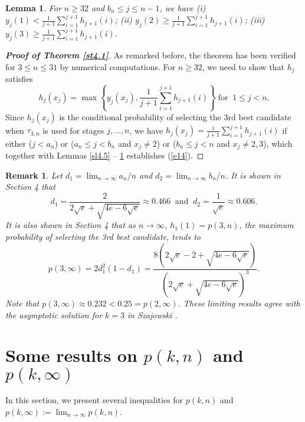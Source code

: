 \documentclass[12pt, A4paper, oneside]{article}
\theoremstyle{plain}
\newtheorem{lem}{Lemma}[section]
\newtheorem{rem}{Remark}[section]
\numberwithin{equation}{section}
\begin{document}
\begin{lem}\label{sl4.7}
For $n\ge32$ and $b_n\le j\le n-1$, we have
\upshape(i) $y_j(1)<\frac{1}{j+1}\sum_{i=1}^{j+1}h_{j+1}(i)$; (ii) $y_j(2)\ge\frac{1}{j+1}\sum_{i=1}^{j+1}h_{j+1}(i)$; (iii) $y_j(3)\ge\frac{1}{j+1}\sum_{i=1}^{j+1}h_{j+1}(i)$.
\end{lem}



\begin{proof}[\bf Proof of Theorem \ref{st4.1}]
As remarked before, the theorem has been verified for $3\le n\le31$ by numerical computations.
For $n\ge32$, we need to show that $h_j$ satisfies
\begin{equation}\label{e14}
h_j(x_j)=\max\left\{y_j(x_j),\frac{1}{j+1}\sum_{i=1}^{j+1}h_{j+1}(i)\right\}\;\mbox{for}\;\;1\le j<n.
\end{equation}
Since $h_j(x_j)$ is the conditional probability of selecting the 3rd best candidate when $\tau_{3,n}$ is used for stages $j,\dots,n$, we have $h_j(x_j)=\frac{1}{j+1}\sum_{i=1}^{j+1}h_{j+1}(i)$ if either ($j<a_n$) or ($a_n\le j<b_n$ and $x_j\neq 2$) or ($b_n\le j<n$ and $x_j\neq 2,3$), which together with Lemmas \ref{sl4.5} -- \ref{sl4.7} establishes (\ref{e14}).
\end{proof}

\begin{rem}\label{r1}
Let $d_1=\lim_{n\to\infty} a_n/n$ and $d_2=\lim_{n\to\infty} b_n/n$. It is shown in Section 4 that
\begin{equation}\label{b5}
d_1=\frac{2}{2\sqrt{e}+\sqrt{4e-6\sqrt{e}}}\approx0.466\;\;\mbox{and}\;\;d_2=\frac{1}{\sqrt{e}}\approx0.606.
\end{equation}
It is also shown in Section 4 that as $n \to \infty$, $h_1(1)=p(3,n)$, the maximum probability of selecting the 3rd best candidate, tends to
\begin{equation}\label{b6}
p(3,\infty)=2d_1^2(1-d_1)=\frac{8\left(2\sqrt{e}-2+\sqrt{4e-6\sqrt{e}}\right)}{\left(2\sqrt{e}+\sqrt{4e-6\sqrt{e}}\right)^3}.
\end{equation}
Note that $p(3,\infty)\approx0.232<0.25=p(2,\infty)$. These limiting results agree with the asymptotic solution for $k=3$ in Szajowski \cite{ref26}.
\end{rem}





\section{Some  results on $p(k,n)$ and $p(k,\infty)$}
\hspace*{18pt}In this section, we present several inequalities for $p(k,n)$ and $p(k,\infty):=\lim_{n \to \infty} p(k,n)$.
\end{document}
